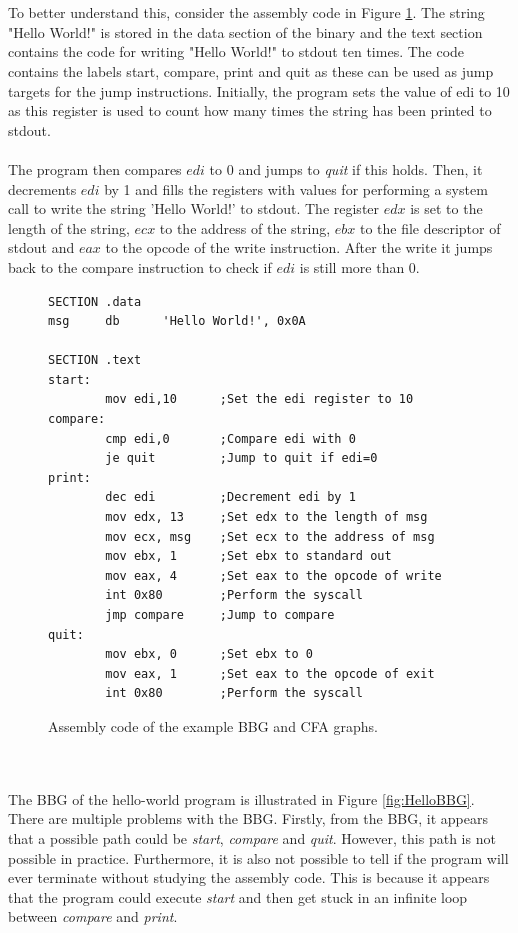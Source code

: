 \documentclass{kththesis}
\renewcommand{\it}[1]{\textit{#1}}
\begin{document}
\\ \\
To better understand this, consider the assembly code in Figure \ref{fig:assembly}. The string "Hello World!" is stored in the data section of the binary and the text section contains the code for writing "Hello World!" to stdout ten times. The code contains the labels start, compare, print and quit as these can be used as jump targets for the jump instructions. Initially, the program sets the value of edi to 10 as this register is used to count how many times the string has been printed to stdout.
\\ \\
The program then compares $edi$ to 0 and jumps to \it{quit} if this holds. Then, it decrements $edi$ by 1 and fills the registers with values for performing a system call to write the string 'Hello World!' to stdout. The register $edx$ is set to the length of the string, $ecx$ to the address of the string, $ebx$ to the file descriptor of stdout and $eax$ to the opcode of the write instruction. After the write it jumps back to the compare instruction to check if $edi$ is still more than 0. 
\begin{figure}[t]
    \centering
\begin{tcolorbox}
\begin{verbatim}
SECTION .data
msg     db      'Hello World!', 0x0A

SECTION .text
start:
        mov edi,10      ;Set the edi register to 10
compare:
        cmp edi,0       ;Compare edi with 0
        je quit         ;Jump to quit if edi=0
print:
        dec edi         ;Decrement edi by 1
        mov edx, 13     ;Set edx to the length of msg
        mov ecx, msg    ;Set ecx to the address of msg
        mov ebx, 1      ;Set ebx to standard out
        mov eax, 4      ;Set eax to the opcode of write
        int 0x80        ;Perform the syscall
        jmp compare     ;Jump to compare
quit:
        mov ebx, 0      ;Set ebx to 0
        mov eax, 1      ;Set eax to the opcode of exit
        int 0x80        ;Perform the syscall
\end{verbatim}
\end{tcolorbox}
\caption[Assembly code of the example BBG and CFA graphs.]{Assembly code of the example BBG and CFA graphs.}
    \label{fig:assembly}
\end{figure}
\noindent
\\ \\
The BBG of the hello-world program is illustrated in Figure \ref{fig:HelloBBG}. There are multiple problems with the BBG. Firstly, from the BBG, it appears that a possible path could be \it{start}, \it{compare} and \it{quit}. However, this path is not possible in practice. Furthermore, it is also not possible to tell if the program will ever terminate without studying the assembly code. This is because it appears that the program could execute \it{start} and then get stuck in an infinite loop between \it{compare} and \it{print}.
\end{document}

